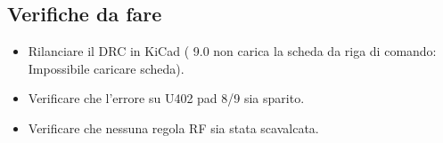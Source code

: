 \subsection{Verifiche da fare}
\begin{itemize}
\item Rilanciare il DRC in KiCad ( 9.0 non carica la scheda da riga di comando: \guillemotleft{}Impossibile caricare scheda\guillemotright).
\item Verificare che l'errore su U402 pad 8/9 sia sparito.
\item Verificare che nessuna regola RF sia stata scavalcata.
\end{itemize}

